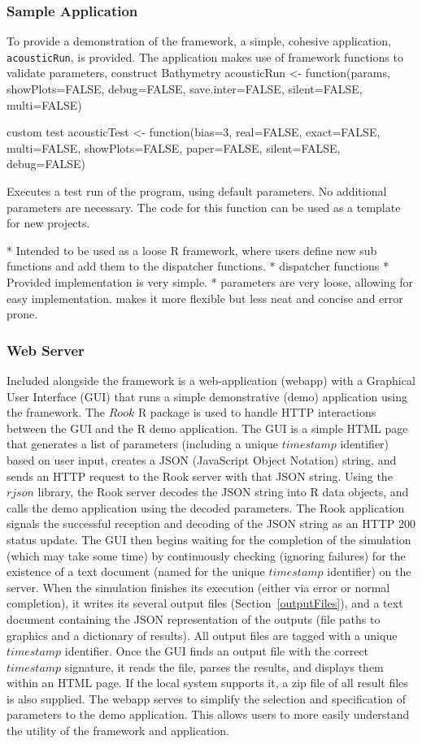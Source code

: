 \subsubsection{Sample Application}
To provide a demonstration of the framework, a simple, cohesive application, \texttt{acousticRun}, is provided.  The application makes use of framework functions to validate parameters, construct Bathymetry
acousticRun <- function(params, showPlots=FALSE, debug=FALSE, save.inter=FALSE, silent=FALSE, multi=FALSE) {

custom test
acousticTest <- function(bias=3, real=FALSE, exact=FALSE, multi=FALSE, showPlots=FALSE, paper=FALSE, silent=FALSE, debug=FALSE) {
	Executes a test run of the program, using default parameters.  No additional 
	parameters are necessary. The code for this function can be used as a template for new projects.


* Intended to be used as a loose R framework, where users define new sub functions and add them to the dispatcher functions.
* dispatcher functions
* Provided implementation is very simple.
* parameters are very loose, allowing for easy implementation. makes it more flexible but less neat and concise and error prone.

\subsubsection{Web Server}
\label{webServer}
Included alongside the framework is a web-application (webapp) with a Graphical User Interface (GUI) that runs a simple demonstrative (demo) application using the framework.  The $Rook$ R package is used to handle HTTP interactions between the GUI and the R demo application.  The GUI is a simple HTML page that generates a list of parameters (including a unique $timestamp$ identifier) based on user input, creates a JSON (JavaScript Object Notation) string, and sends an HTTP request to the Rook server with that JSON string.  Using the $rjson$ library, the Rook server decodes the JSON string into R data objects, and calls the demo application using the decoded parameters.  The Rook application signals the successful reception and decoding of the JSON string as an HTTP 200 status update.  The GUI then begins waiting for the completion of the simulation (which may take some time) by continuously checking (ignoring failures) for the existence of a text document (named for the unique $timestamp$ identifier) on the server.  When the simulation finishes its execution (either via error or normal completion), it writes its several output files (Section~\ref{outputFiles}), and a text document containing the JSON representation of the outputs (file paths to graphics and a dictionary of results).  All output files are tagged with a unique $timestamp$ identifier.  Once the GUI finds an output file with the correct $timestamp$ signature, it reads the file, parses the results, and displays them within an HTML page.  If the local system supports it, a zip file of all result files is also supplied.  The webapp serves to simplify the selection and specification of parameters to the demo application.  This allows users to more easily understand the utility of the framework and application.

}}
